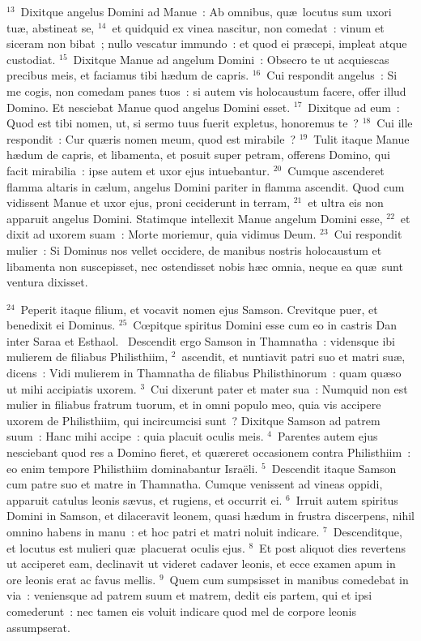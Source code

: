 ${}^{13}$~Dixitque angelus Domini ad Manue~: Ab omnibus, qu\ae\ locutus sum uxori tu\ae , abstineat se,
${}^{14}$~et quidquid ex vinea nascitur, non comedat~: vinum et siceram non bibat~; nullo vescatur immundo~: et quod ei pr\ae cepi, impleat atque custodiat.
${}^{15}$~Dixitque Manue ad angelum Domini~: Obsecro te ut acquiescas precibus meis, et faciamus tibi h\ae dum de capris.
${}^{16}$~Cui respondit angelus~: Si me cogis, non comedam panes tuos~: si autem vis holocaustum facere, offer illud Domino. Et nesciebat Manue quod angelus Domini esset.
${}^{17}$~Dixitque ad eum~: Quod est tibi nomen, ut, si sermo tuus fuerit expletus, honoremus te~?
${}^{18}$~Cui ille respondit~: Cur qu\ae ris nomen meum, quod est mirabile~?
${}^{19}$~Tulit itaque Manue h\ae dum de capris, et libamenta, et posuit super petram, offerens Domino, qui facit mirabilia~: ipse autem et uxor ejus intuebantur.
${}^{20}$~Cumque ascenderet flamma altaris in c\ae lum, angelus Domini pariter in flamma ascendit. Quod cum vidissent Manue et uxor ejus, proni ceciderunt in terram,
${}^{21}$~et ultra eis non apparuit angelus Domini. Statimque intellexit Manue angelum Domini esse,
${}^{22}$~et dixit ad uxorem suam~: Morte moriemur, quia vidimus Deum.
${}^{23}$~Cui respondit mulier~: Si Dominus nos vellet occidere, de manibus nostris holocaustum et libamenta non suscepisset, nec ostendisset nobis h\ae c omnia, neque ea qu\ae\ sunt ventura dixisset.


${}^{24}$~Peperit itaque filium, et vocavit nomen ejus Samson. Crevitque puer, et benedixit ei Dominus.
${}^{25}$~Cœpitque spiritus Domini esse cum eo in castris Dan inter Saraa et Esthaol.
~Descendit ergo Samson in Thamnatha~: vidensque ibi mulierem de filiabus Philisthiim,
${}^{2}$~ascendit, et nuntiavit patri suo et matri su\ae , dicens~: Vidi mulierem in Thamnatha de filiabus Philisthinorum~: quam qu\ae so ut mihi accipiatis uxorem.
${}^{3}$~Cui dixerunt pater et mater sua~: Numquid non est mulier in filiabus fratrum tuorum, et in omni populo meo, quia vis accipere uxorem de Philisthiim, qui incircumcisi sunt~? Dixitque Samson ad patrem suum~: Hanc mihi accipe~: quia placuit oculis meis.
${}^{4}$~Parentes autem ejus nesciebant quod res a Domino fieret, et qu\ae reret occasionem contra Philisthiim~: eo enim tempore Philisthiim dominabantur Isra\"eli.
${}^{5}$~Descendit itaque Samson cum patre suo et matre in Thamnatha. Cumque venissent ad vineas oppidi, apparuit catulus leonis s\ae vus, et rugiens, et occurrit ei.
${}^{6}$~Irruit autem spiritus Domini in Samson, et dilaceravit leonem, quasi h\ae dum in frustra discerpens, nihil omnino habens in manu~: et hoc patri et matri noluit indicare.
${}^{7}$~Descenditque, et locutus est mulieri qu\ae\ placuerat oculis ejus.
${}^{8}$~Et post aliquot dies revertens ut acciperet eam, declinavit ut videret cadaver leonis, et ecce examen apum in ore leonis erat ac favus mellis.
${}^{9}$~Quem cum sumpsisset in manibus comedebat in via~: veniensque ad patrem suum et matrem, dedit eis partem, qui et ipsi comederunt~: nec tamen eis voluit indicare quod mel de corpore leonis assumpserat.


